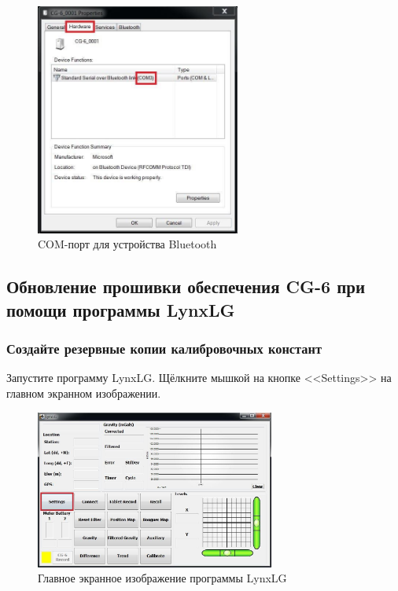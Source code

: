 \newpage
\begin{figure}[H]
  \centering
  \includegraphics[width=0.6\textwidth]{figures/bluetooth_device_com_port}
  \caption{COM-порт для устройства Bluetooth}
  \label{fig:bluetooth_device_com_port}
\end{figure}

\subsection[Обновление прошивки при помощи LynxLG]{Обновление прошивки обеспечения CG-6 при помощи программы LynxLG}
\label{subsec:upgrading_cg6_firmware_with_lynxlg_software}


\subsubsection{Создайте резервные копии калибровочных констант}

Запустите программу LynxLG. Щёлкните мышкой на кнопке <<Settings>> на главном
экранном изображении.

\newpage
\begin{figure}[H]
  \centering
  \includegraphics[width=0.7\textwidth]{figures/the_lynxlg_software_main_screen}
  \caption{Главное экранное изображение программы LynxLG}
  \label{fig:the_lynxlg_software_main_screen}
\end{figure}

